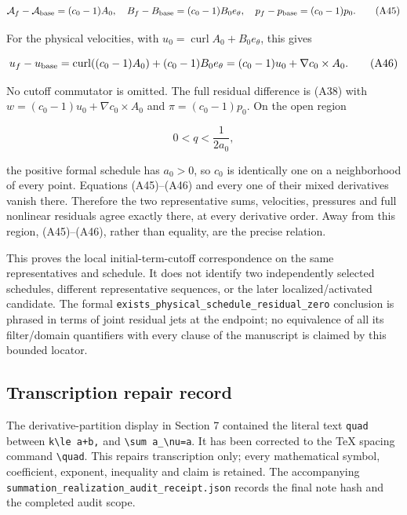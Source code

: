 \documentclass[10pt,a4paper]{article}
\begin{document}
\[
\mathcal A_f-\mathcal A_{\rm base}=(c_0-1)A_0,\quad
B_f-B_{\rm base}=(c_0-1)B_0e_\theta,\quad
p_f-p_{\rm base}=(c_0-1)p_0.
\tag{A45}
\]

For the physical velocities, with \(u_0=\operatorname{curl}A_0+B_0e_\theta\), this gives

\[
u_f-u_{\rm base}
=\operatorname{curl}((c_0-1)A_0)+(c_0-1)B_0e_\theta
=(c_0-1)u_0+\nabla c_0\times A_0.
\tag{A46}
\]

No cutoff commutator is omitted. The full residual difference is (A38) with \(w=(c_0-1)u_0+\nabla c_0\times A_0\) and \(\pi=(c_0-1)p_0\). On the open region

\[
0<q<\frac1{2a_0},
\tag{A47}
\]

the positive formal schedule has \(a_0>0\), so \(c_0\) is identically one on a neighborhood of every point. Equations (A45)--(A46) and every one of their mixed derivatives vanish there. Therefore the two representative sums, velocities, pressures and full nonlinear residuals agree exactly there, at every derivative order. Away from this region, (A45)--(A46), rather than equality, are the precise relation.

This proves the local initial-term-cutoff correspondence on the same representatives and schedule. It does not identify two independently selected schedules, different representative sequences, or the later localized/activated candidate. The formal \nolinkurl{exists_physical_schedule_residual_zero} conclusion is phrased in terms of joint residual jets at the endpoint; no equivalence of all its filter/domain quantifiers with every clause of the manuscript is claimed by this bounded locator.

\subsection{Transcription repair record}\label{transcription-repair-record}

The derivative-partition display in Section 7 contained the literal text \nolinkurl{quad} between \texttt{k\textquotesingle{}\textbackslash{}le\ a+b,} and \texttt{\textbackslash{}sum\ a\_\textbackslash{}nu=a}. It has been corrected to the TeX spacing command \texttt{\textbackslash{}quad}. This repairs transcription only; every mathematical symbol, coefficient, exponent, inequality and claim is retained. The accompanying \nolinkurl{summation_realization_audit_receipt.json} records the final note hash and the completed audit scope.


\end{document}
